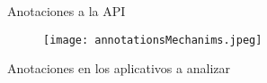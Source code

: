 % 	
% 
% 
% 
% 

\begin{frame}{Anotaciones a la API}
	\begin{figure}[t!]
		\begin{center} 
		\texttt{[image: annotationsMechanims.jpeg]} 
		\end{center}
	\end{figure}
\end{frame}

\begin{frame}{Anotaciones en los aplicativos a analizar}
	
\end{frame}
